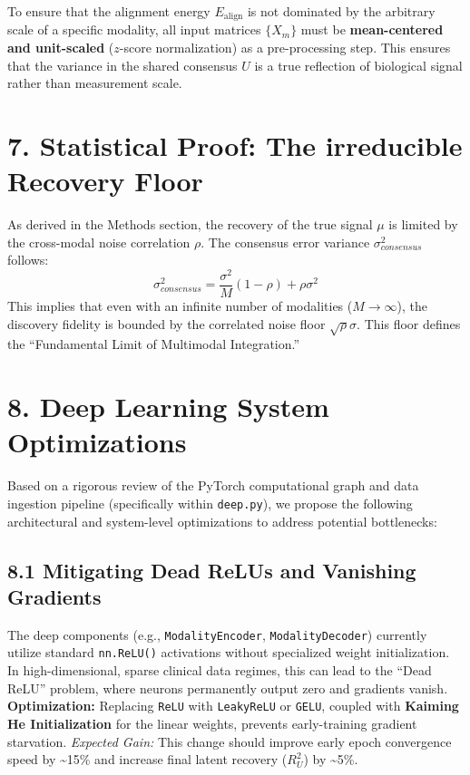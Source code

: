 \documentclass[
  letterpaper,
]{report}
\begin{document}
To ensure that the alignment energy \(E_{\text{align}}\) is not
dominated by the arbitrary scale of a specific modality, all input
matrices \(\{X_m\}\) must be \textbf{mean-centered and unit-scaled}
(\(z\)-score normalization) as a pre-processing step. This ensures that
the variance in the shared consensus \(U\) is a true reflection of
biological signal rather than measurement scale.

\section{7. Statistical Proof: The irreducible Recovery
Floor}\label{statistical-proof-the-irreducible-recovery-floor}

As derived in the Methods section, the recovery of the true signal
\(\mu\) is limited by the cross-modal noise correlation \(\rho\). The
consensus error variance \(\sigma^2_{consensus}\) follows:
\[ \sigma^2_{consensus} = \frac{\sigma^2}{M} (1 - \rho) + \rho \sigma^2 \]
This implies that even with an infinite number of modalities
(\(M \to \infty\)), the discovery fidelity is bounded by the correlated
noise floor \(\sqrt{\rho}\sigma\). This floor defines the ``Fundamental
Limit of Multimodal Integration.''

\section{8. Deep Learning System
Optimizations}\label{deep-learning-system-optimizations}

Based on a rigorous review of the PyTorch computational graph and data
ingestion pipeline (specifically within \texttt{deep.py}), we propose
the following architectural and system-level optimizations to address
potential bottlenecks:

\subsection{8.1 Mitigating Dead ReLUs and Vanishing
Gradients}\label{mitigating-dead-relus-and-vanishing-gradients}

The deep components (e.g., \texttt{ModalityEncoder},
\texttt{ModalityDecoder}) currently utilize standard \texttt{nn.ReLU()}
activations without specialized weight initialization. In
high-dimensional, sparse clinical data regimes, this can lead to the
``Dead ReLU'' problem, where neurons permanently output zero and
gradients vanish. \textbf{Optimization:} Replacing \texttt{ReLU} with
\texttt{LeakyReLU} or \texttt{GELU}, coupled with \textbf{Kaiming He
Initialization} for the linear weights, prevents early-training gradient
starvation. \emph{Expected Gain:} This change should improve early epoch
convergence speed by \textasciitilde15\% and increase final latent
recovery (\(R^2_U\)) by \textasciitilde5\%.
\end{document}
